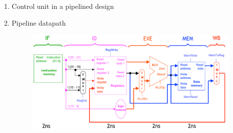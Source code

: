 \begin{enumerate}
    \item  Control unit in a pipelined design


    \item Pipeline datapath \\
        \begin{figure}[h]
            \centering   \includegraphics[scale=0.5]{./images/pipeline_datapath.jpeg}
        \end{figure}

\end{enumerate}
